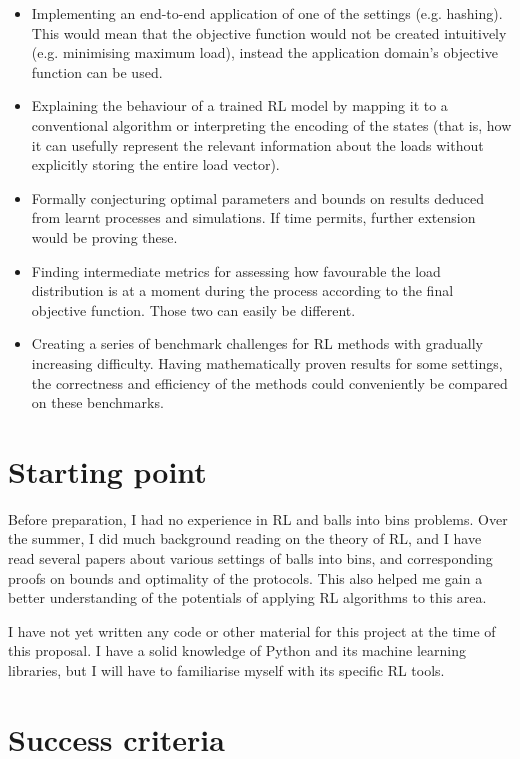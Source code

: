 \begin{itemize}
    \item
    Implementing an end-to-end application of one of the settings (e.g. hashing). This would mean that the objective function would not be created intuitively (e.g. minimising maximum load), instead the application domain's objective function can be used.
    \item
    Explaining the behaviour of a trained RL model by mapping it to a conventional algorithm or interpreting the encoding of the states (that is, how it can usefully represent the relevant information about the loads without explicitly storing the entire load vector).
    \item
    Formally conjecturing optimal parameters and bounds on results deduced from learnt processes and simulations. If time permits, further extension would be proving these.
    \item
    Finding intermediate metrics for assessing how favourable the load distribution is at a moment during the process according to the final objective function. Those two can easily be different.
    \item
    Creating a series of benchmark challenges for RL methods with gradually increasing difficulty. Having mathematically proven results for some settings, the correctness and efficiency of the methods could conveniently be compared on these benchmarks.
\end{itemize}


\section*{Starting point}

Before preparation, I had no experience in RL and balls into bins problems. Over the summer, I did much background reading on the theory of RL, and I have read several papers about various settings of balls into bins, and corresponding proofs on bounds and optimality of the protocols. This also helped me gain a better understanding of the potentials of applying RL algorithms to this area.

I have not yet written any code or other material for this project at the time of this proposal. I have a solid knowledge of Python and its machine learning libraries, but I will have to familiarise myself with its specific RL tools.

\section*{Success criteria}

